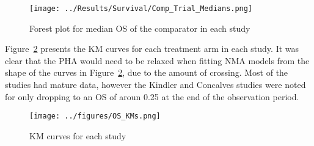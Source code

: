 \begin{figure}[h]
    \centering
    \texttt{[image: ../Results/Survival/Comp\_Trial\_Medians.png]} 
    \caption{Forest plot for median OS of the comparator in each study}
    \label{fig:CompMedForest}
\end{figure}

Figure~\ref{fig:OSKMs} presents the KM curves for each treatment arm in each study. It was clear that the PHA would need to be relaxed when fitting NMA models from the shape of the curves in Figure~\ref{fig:OSKMs}, due to the amount of crossing. Most of the studies had mature data, however the Kindler and Concalves studies were noted for only dropping to an OS of aroun 0.25 at the end of the observation period.

\begin{figure}[h]
    \centering
    \texttt{[image: ../figures/OS\_KMs.png]} 
    \caption{KM curves for each study}
    \label{fig:OSKMs}
\end{figure}